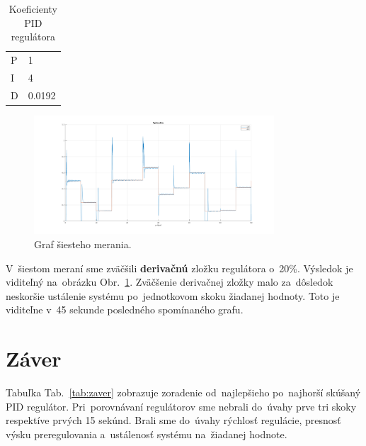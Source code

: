 \documentclass{article}
\begin{document}
\begin{table}[!htbp]
	\caption{Koeficienty PID regulátora}
	\label{tab:t6}
	\begin{center}
		\begin{tabular}[c]{|l|l|}
			\hline
			P & 1 \\
			I & 4 \\
			D & 0.0192 \\
			\hline
		\end{tabular}
	\end{center}
\end{table}

\begin{figure}[!htbp]
	\begin{center}
		\includegraphics[width=0.8\textwidth]{./include/m7.png}
	\end{center}
	\caption{Graf šiesteho merania.}
	\label{fig:meranie6}
\end{figure}

V~šiestom meraní sme zväčšili \textbf{derivačnú} zložku regulátora o~20\%. Výsledok je viditeľný
na~obrázku Obr.~\ref{fig:meranie6}. Zväčšenie derivačnej zložky malo za~dôsledok neskoršie
ustálenie systému po~jednotkovom skoku žiadanej hodnoty. Toto je viditeľne v~45 sekunde posledného
spomínaného grafu.

\clearpage

\section{Záver}
\label{sec:zaver}

Tabuľka Tab.~\ref{tab:zaver} zobrazuje zoradenie od~najlepšieho po~najhorší skúšaný PID regulátor.
Pri~porovnávaní regulátorov sme nebrali do~úvahy prve tri skoky respektíve prvých 15 sekúnd.
Brali sme do~úvahy rýchlosť regulácie, presnosť výsku preregulovania a~ustálenosť systému
na~žiadanej hodnote.
\end{document}
